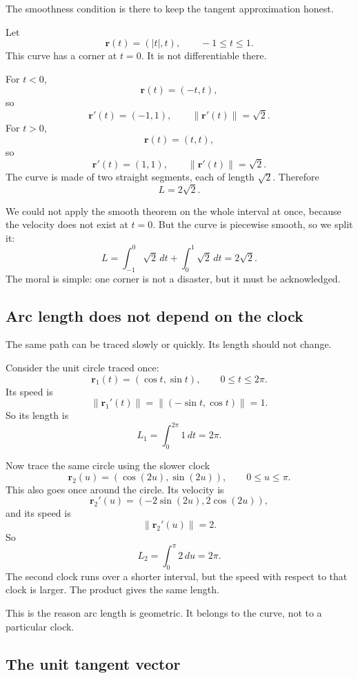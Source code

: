 The smoothness condition is there to keep the tangent approximation honest.

\begin{example}
Let
\[
    \mathbf r(t)=(|t|,t),
    \qquad -1\le t\le1.
\]
This curve has a corner at \(t=0\).  It is not differentiable there.

For \(t<0\),
\[
    \mathbf r(t)=(-t,t),
\]
so
\[
    \mathbf r'(t)=(-1,1),
    \qquad
    \|\mathbf r'(t)\|=\sqrt2.
\]
For \(t>0\),
\[
    \mathbf r(t)=(t,t),
\]
so
\[
    \mathbf r'(t)=(1,1),
    \qquad
    \|\mathbf r'(t)\|=\sqrt2.
\]
The curve is made of two straight segments, each of length \(\sqrt2\).  Therefore
\[
    L=2\sqrt2.
\]

We could not apply the smooth theorem on the whole interval at once, because the
velocity does not exist at \(t=0\).  But the curve is piecewise smooth, so we split it:
\[
    L
    =
    \int_{-1}^0\sqrt2\,dt
    +
    \int_0^1\sqrt2\,dt
    =
    2\sqrt2.
\]
The moral is simple: one corner is not a disaster, but it must be acknowledged.
\end{example}

\subsection{Arc length does not depend on the clock}

The same path can be traced slowly or quickly.  Its length should not change.

Consider the unit circle traced once:
\[
    \mathbf r_1(t)=(\cos t,\sin t),
    \qquad 0\le t\le2\pi.
\]
Its speed is
\[
    \|\mathbf r_1'(t)\|
    =
    \|(-\sin t,\cos t)\|
    =
    1.
\]
So its length is
\[
    L_1=\int_0^{2\pi}1\,dt=2\pi.
\]

Now trace the same circle using the slower clock
\[
    \mathbf r_2(u)=(\cos(2u),\sin(2u)),
    \qquad 0\le u\le\pi.
\]
This also goes once around the circle.  Its velocity is
\[
    \mathbf r_2'(u)=(-2\sin(2u),2\cos(2u)),
\]
and its speed is
\[
    \|\mathbf r_2'(u)\|=2.
\]
So
\[
    L_2=\int_0^\pi 2\,du=2\pi.
\]
The second clock runs over a shorter interval, but the speed with respect to that clock
is larger.  The product gives the same length.

This is the reason arc length is geometric.  It belongs to the curve, not to a particular
clock.

\subsection{The unit tangent vector}

